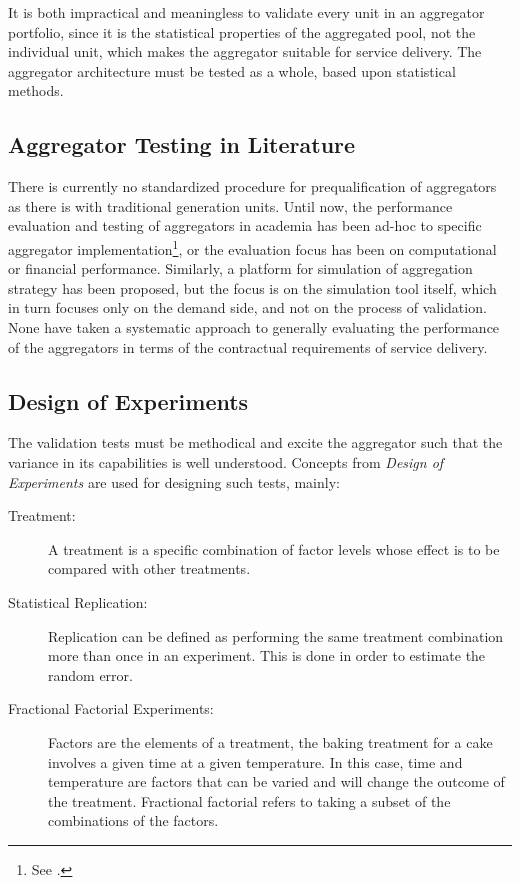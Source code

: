 \begin{enumerate}
\end{enumerate}

It is both impractical and meaningless to validate every unit in an aggregator portfolio, since it is the statistical properties of the aggregated pool, not the individual unit, which makes the aggregator suitable for service delivery. The aggregator architecture must be tested as a whole, based upon statistical methods.

\subsection{Aggregator Testing in Literature}\label{subsec:aggtest}
There is currently no standardized procedure for prequalification of aggregators as there is with traditional generation units. Until now, the performance evaluation and testing of aggregators in academia has been ad-hoc to specific aggregator implementation\footnote{See \eg \cite{vrettos2015integrating,hu2014coordinated,leemput2012a}.}, or the evaluation focus has been on computational or financial performance. Similarly, a platform for simulation of aggregation strategy has been proposed, but the focus is on the simulation tool itself, which in turn focuses only on the demand side, and not on the process of validation. None have taken a systematic approach to generally evaluating the performance of the aggregators in terms of the contractual requirements of service delivery.

\subsection{Design of Experiments} %
\label{sub:DesignofExperiments}
The validation tests must be methodical and excite the aggregator such that the variance in its capabilities is well understood. Concepts from \emph{Design of Experiments} are used for designing such tests, mainly:
\begin{description}
	\item[Treatment:] A treatment is a specific combination of factor levels whose effect is to be compared with other treatments.
	\item[Statistical Replication:] Replication can be defined as performing the same treatment combination more than once in an experiment. This is done in order to estimate the random error. 
	\item[Fractional Factorial Experiments:] Factors are the elements of a treatment, \eg the baking treatment for a cake involves a given time at a given temperature. In this case, time and temperature are factors that can be varied and will change the outcome of the treatment. Fractional factorial refers to taking a subset of the combinations of the factors.
\end{description}

